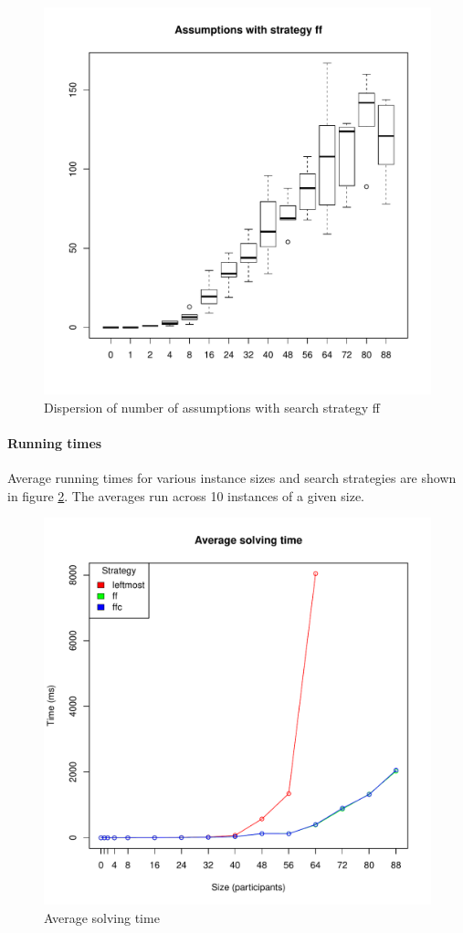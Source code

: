 \documentclass{article}
\begin{document}
\begin{figure}
\centering
\includegraphics[width=\linewidth]{ff_assumptions}
\caption{Dispersion of number of assumptions with search strategy \acrshort{ff}}
\label{fig:ff-assumptions}
\end{figure}

\paragraph{Running times}
Average running times for various instance sizes and search strategies are shown
in figure \ref{fig:time}.
The averages run across 10 instances of a given size.

\begin{figure}
\centering
\includegraphics[width=\linewidth]{time}
\caption{Average solving time}
\label{fig:time}
\end{figure}
\end{document}
